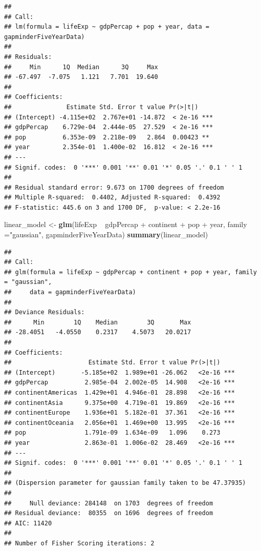 \documentclass[]{article}
\newenvironment{Shaded}{\begin{snugshade}}{\end{snugshade}}
\newcommand{\KeywordTok}[1]{\textcolor[rgb]{0.13,0.29,0.53}{\textbf{{#1}}}}
\newcommand{\DataTypeTok}[1]{\textcolor[rgb]{0.13,0.29,0.53}{{#1}}}
\newcommand{\StringTok}[1]{\textcolor[rgb]{0.31,0.60,0.02}{{#1}}}
\newcommand{\NormalTok}[1]{{#1}}
\begin{document}
\begin{verbatim}
## 
## Call:
## lm(formula = lifeExp ~ gdpPercap + pop + year, data = gapminderFiveYearData)
## 
## Residuals:
##     Min      1Q  Median      3Q     Max 
## -67.497  -7.075   1.121   7.701  19.640 
## 
## Coefficients:
##               Estimate Std. Error t value Pr(>|t|)    
## (Intercept) -4.115e+02  2.767e+01 -14.872  < 2e-16 ***
## gdpPercap    6.729e-04  2.444e-05  27.529  < 2e-16 ***
## pop          6.353e-09  2.218e-09   2.864  0.00423 ** 
## year         2.354e-01  1.400e-02  16.812  < 2e-16 ***
## ---
## Signif. codes:  0 '***' 0.001 '**' 0.01 '*' 0.05 '.' 0.1 ' ' 1
## 
## Residual standard error: 9.673 on 1700 degrees of freedom
## Multiple R-squared:  0.4402, Adjusted R-squared:  0.4392 
## F-statistic: 445.6 on 3 and 1700 DF,  p-value: < 2.2e-16
\end{verbatim}

\begin{Shaded}
\begin{Highlighting}[]
\NormalTok{linear_model <-}\StringTok{ }\KeywordTok{glm}\NormalTok{(lifeExp ~}\StringTok{ }\NormalTok{gdpPercap +}\StringTok{ }\NormalTok{continent +}\StringTok{ }\NormalTok{pop +}\StringTok{ }\NormalTok{year, }\DataTypeTok{family  =}\StringTok{"gaussian"}\NormalTok{, gapminderFiveYearData)}
\KeywordTok{summary}\NormalTok{(linear_model)}
\end{Highlighting}
\end{Shaded}

\begin{verbatim}
## 
## Call:
## glm(formula = lifeExp ~ gdpPercap + continent + pop + year, family = "gaussian", 
##     data = gapminderFiveYearData)
## 
## Deviance Residuals: 
##      Min        1Q    Median        3Q       Max  
## -28.4051   -4.0550    0.2317    4.5073   20.0217  
## 
## Coefficients:
##                     Estimate Std. Error t value Pr(>|t|)    
## (Intercept)       -5.185e+02  1.989e+01 -26.062   <2e-16 ***
## gdpPercap          2.985e-04  2.002e-05  14.908   <2e-16 ***
## continentAmericas  1.429e+01  4.946e-01  28.898   <2e-16 ***
## continentAsia      9.375e+00  4.719e-01  19.869   <2e-16 ***
## continentEurope    1.936e+01  5.182e-01  37.361   <2e-16 ***
## continentOceania   2.056e+01  1.469e+00  13.995   <2e-16 ***
## pop                1.791e-09  1.634e-09   1.096    0.273    
## year               2.863e-01  1.006e-02  28.469   <2e-16 ***
## ---
## Signif. codes:  0 '***' 0.001 '**' 0.01 '*' 0.05 '.' 0.1 ' ' 1
## 
## (Dispersion parameter for gaussian family taken to be 47.37935)
## 
##     Null deviance: 284148  on 1703  degrees of freedom
## Residual deviance:  80355  on 1696  degrees of freedom
## AIC: 11420
## 
## Number of Fisher Scoring iterations: 2
\end{verbatim}
\end{document}
